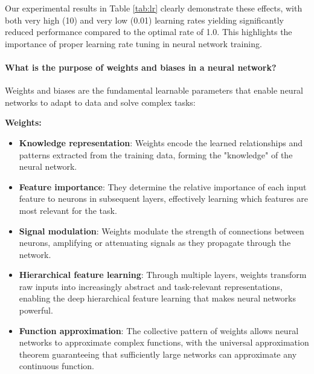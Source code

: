 \documentclass[twocolumn]{extarticle}
\begin{document}
Our experimental results in Table \ref{tab:lr} clearly demonstrate these effects, with both very high (10) and very low (0.01) learning rates yielding significantly reduced performance compared to the optimal rate of 1.0. This highlights the importance of proper learning rate tuning in neural network training.

\paragraph{What is the purpose of weights and biases in a neural network?}
Weights and biases are the fundamental learnable parameters that enable neural networks to adapt to data and solve complex tasks:

\textbf{Weights:}
\begin{itemize}
    \item \textbf{Knowledge representation}: Weights encode the learned relationships and patterns extracted from the training data, forming the "knowledge" of the neural network.
    \item \textbf{Feature importance}: They determine the relative importance of each input feature to neurons in subsequent layers, effectively learning which features are most relevant for the task.
    \item \textbf{Signal modulation}: Weights modulate the strength of connections between neurons, amplifying or attenuating signals as they propagate through the network.
    \item \textbf{Hierarchical feature learning}: Through multiple layers, weights transform raw inputs into increasingly abstract and task-relevant representations, enabling the deep hierarchical feature learning that makes neural networks powerful.
    \item \textbf{Function approximation}: The collective pattern of weights allows neural networks to approximate complex functions, with the universal approximation theorem guaranteeing that sufficiently large networks can approximate any continuous function.
\end{itemize}
\end{document}
